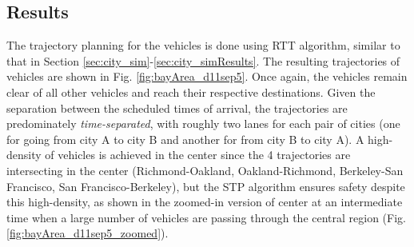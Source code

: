 \subsection{Results \label{sec:bayArea_simResults}}
The trajectory planning for the vehicles is done using RTT algorithm, similar to that in Section \ref{sec:city_sim}-\ref{sec:city_simResults}. The resulting trajectories of vehicles are shown in Fig. \ref{fig:bayArea_d11sep5}. Once again, the vehicles remain clear of all other vehicles and reach their respective destinations. Given the separation between the scheduled times of arrival, the trajectories are predominately \textit{time-separated}, with roughly two lanes for each pair of cities (one for going from city A to city B and another for from city B to city A). A high-density of vehicles is achieved in the center since the 4 trajectories are intersecting in the center (Richmond-Oakland, Oakland-Richmond, Berkeley-San Francisco, San Francisco-Berkeley), but the STP algorithm ensures safety despite this high-density, as shown in the zoomed-in version of center at an intermediate time when a large number of vehicles are passing through the central region (Fig. \ref{fig:bayArea_d11sep5_zoomed}).  
%
